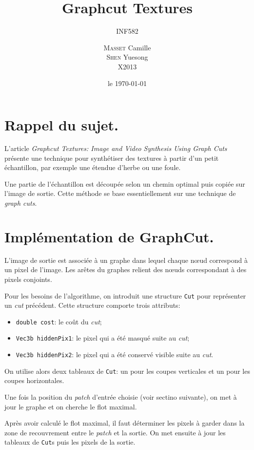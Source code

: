 \documentclass[a4paper, 12pt]{article}
\title{Graphcut Textures}
\subtitle{INF582}
\author{\textsc{Masset} Camille \\ \textsc{Shen} Yuesong \\ X2013}
\date{le \today}
\begin{document}
\renewcommand{\arraystretch}{1.5}
\newcommand{\grc}{\emph{graph cuts}}

\maketitle

\section{Rappel du sujet.}
L'article \emph{Graphcut Textures: Image and Video Synthesis Using Graph Cuts} présente une technique
pour synthétiser des textures à partir d'un petit échantillon, par exemple une étendue d'herbe ou une foule.

Une partie de l'échantillon est découpée selon un chemin optimal puis copiée sur l'image de sortie.
Cette méthode se base essentiellement sur une technique de \grc{}.


\section{Implémentation de GraphCut.}
L'image de sortie est associée à un graphe dans lequel chaque n\oe{}ud correspond à un pixel de l'image.
Les arêtes du graphes relient des n\oe{}uds correspondant à des pixels conjoints.

Pour les besoins de l'algorithme, on introduit une structure \verb|Cut| pour représenter un \emph{cut} précédent.
Cette structure comporte trois attributs:
\begin{itemize}
    \item \verb|double cost|: le coût du \emph{cut};
    \item \verb|Vec3b hiddenPix1|: le pixel qui a été masqué suite au \emph{cut};
    \item \verb|Vec3b hiddenPix2|: le pixel qui a été conservé visible suite au \emph{cut}.
\end{itemize}
On utilise alors deux tableaux de \verb|Cut|: un pour les coupes verticales et un pour les coupes horizontales.

Une fois la position du \emph{patch} d'entrée choisie (voir sectino suivante), on met à jour le graphe et on cherche le flot maximal.

Après avoir calculé le flot maximal, il faut déterminer les pixels à garder dans la zone de recouvrement entre le \emph{patch} et la sortie.
On met ensuite à jour les tableaux de \verb|Cut|s puis les pixels de la sortie.
\end{document}
